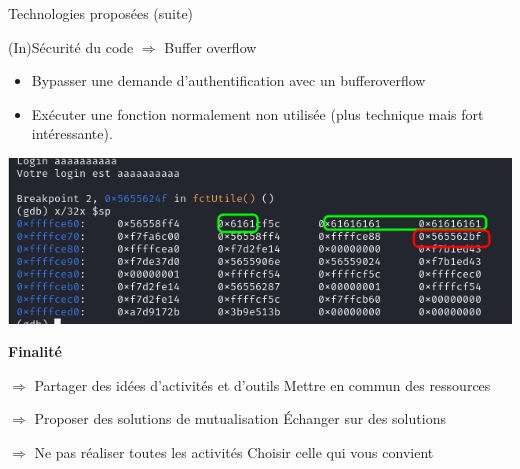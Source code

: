 \documentclass[12pt, handout]{beamer}
\begin{document}
\begin{frame}{Technologies proposées (suite)}

\begin{block}{(In)Sécurité du code $\Rightarrow$ Buffer overflow}
\begin{itemize}
\item Bypasser une demande d'authentification avec un bufferoverflow
\item Exécuter une fonction normalement non utilisée (plus technique mais fort intéressante). 
\end{itemize}
\end{block}


\begin{center}
\includegraphics[scale=0.4]{./ressource/dump_mem.png}
\end{center}

\end{frame}



\begin{frame}{\textbf{Finalité}}
\begin{block}{\Large $\Rightarrow$ Partager des idées d'activités et d'outils}
    \small Mettre en commun des ressources 
\end{block}

\begin{block}{\Large $\Rightarrow$ Proposer des solutions de mutualisation}
    \small Échanger sur des solutions 
\end{block}

\begin{alertblock}{\Large $\Rightarrow$ Ne pas réaliser toutes les activités}
    \small Choisir celle qui vous convient
\end{alertblock}
\end{frame}
\end{document}

